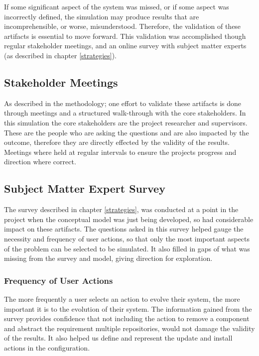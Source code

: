 If some significant aspect of the system was missed, or if some aspect was incorrectly defined, the simulation may produce results that are incomprehensible,
or worse, misunderstood.
Therefore, the validation of these artifacts is essential to move forward. 
This validation was accomplished though regular stakeholder meetings, and an online survey with subject matter experts (as described in chapter \ref{strategies}).

\subsection{Stakeholder Meetings}
As described in the methodology; one effort to validate these artifacts is done through meetings and a structured walk-through with the core stakeholders.
In this simulation the core stakeholders are the project researcher and supervisors.
These are the people who are asking the questions and are also impacted by the outcome, therefore they are directly effected by the validity of the results.
Meetings where held at regular intervals to ensure the projects progress and direction where correct.

\subsection{Subject Matter Expert Survey}
The survey described in chapter \ref{strategies}, 
was conducted at a point in the project when the conceptual model was just being developed, so had considerable impact on these artifacts.
The questions asked in this survey helped gauge the necessity and frequency of user actions,
so that only the most important aspects of the problem can be selected to be simulated.
It also filled in gaps of what was missing from the survey and model, giving direction for exploration.

\subsubsection{Frequency of User Actions}
The more frequently a user selects an action to evolve their system, the more important it is to the evolution of their system.
The information gained from the survey provides confidence that not including the action to remove a component and abstract the requirement multiple repositories, 
would not damage the validity of the results.
It also helped us define and represent the update and install actions in the configuration.

